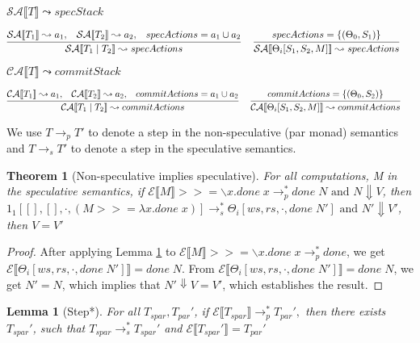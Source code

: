 \documentclass[9pt]{article}
\newtheorem{theorem}{Theorem}
\newtheorem{lemma}{Lemma}
\newcommand\specStep{\rightarrow_{s}}
\newcommand\parStep{\rightarrow_{p}}
\newcommand{\erase}[1]{\mathcal{E}\llbracket #1 \rrbracket}
\newcommand{\specActions}[1]{\mathcal{SA} \llbracket #1 \rrbracket}
\newcommand{\commitActions}[1]{\mathcal{CA} \llbracket #1 \rrbracket}
\begin{document}
$\boxed{\specActions{T} \leadsto specStack} $ 

\[
\infer[]{\specActions{T_1 \; | \; T_2} \leadsto specActions}{\specActions{T_1} \leadsto a_1, \;\;\; \specActions{T_2} \leadsto a_2, \;\;\; specActions = a_1 \cup a_2} \;\;\; 
\infer[]{\specActions{\Theta_i[S_1, S_2, M]} \leadsto specActions}{specActions = \{(\Theta_0, S_1 )\}} \;\;\;
\]

$\boxed{\commitActions{T} \leadsto commitStack} $ 

\[
\infer[]{\commitActions{T_1 \; | \; T_2} \leadsto commitActions}{\commitActions{T_1} \leadsto a_1, \;\;\; \commitActions{T_2} \leadsto a_2, \;\;\; commitActions = a_1 \cup a_2} \;\;\; 
\infer[]{\commitActions{\Theta_i[S_1, S_2, M]} \leadsto commitActions}{commitActions = \{(\Theta_0, S_2 )\}} \;\;\;
\]

We use $T \parStep T'$ to denote a step in the non-speculative (par monad) semantics and $T \specStep T'$ to denote a step in the speculative semantics. 

\begin{theorem}[Non-speculative implies speculative]
For all computations, M in the speculative semantics, if $\erase{M} >>= \backslash x. done \; x \parStep^* done \; N \text{ and } N \Downarrow V$, then $1_1[[], [],\cdot, (M >>= \lambda x. done \; x)] \specStep^* \Theta_i[ws, rs, \cdot, done \; N'] \text{ and } N' \Downarrow V'$, then $V = V'$ 
\end{theorem}

\begin{proof}

After applying Lemma \ref{RunParStar} to $\erase{M} >>= \backslash x. done \; x \parStep^* done$, we get $\erase{\Theta_i[ws, rs, \cdot, done \; N']} = done \; N$.  From $\erase{\Theta_i[ws, rs, \cdot, done \; N']} = done \; N$, we get $N' = N$, which implies that $N' \Downarrow V = V'$, which establishes the result.

\end{proof}

\begin{lemma}[Step*]
\label{RunParStar}
For all $T_{spar}, T_{par}'$, if $\erase{T_{spar}} \parStep^* T_{par}', $ then there exists $T_{spar}'$, such that $T_{spar} \specStep^* T_{spar}'$ and $\erase{T_{spar}'} = T_{par}'$
\end{lemma}
\end{document}
